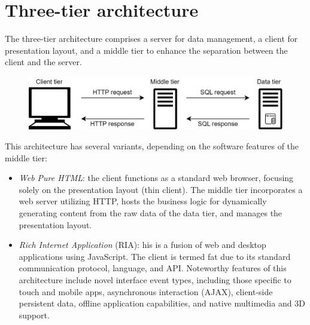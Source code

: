 \section{Three-tier architecture}

The three-tier architecture comprises a server for data management, a client for presentation layout, and a middle tier to enhance the separation between the client and the server.
\begin{figure}[H]
    \centering
    \includegraphics[width=0.5\linewidth]{images/ttph.png}
\end{figure}
This architecture has several variants, depending on the software features of the middle tier:
\begin{itemize}
    \item \textit{Web Pure HTML}: the client functions as a standard web browser, focusing solely on the presentation layout (thin client). 
        The middle tier incorporates a web server utilizing HTTP, hosts the business logic for dynamically generating content from the raw data of the data tier, and manages the presentation layout.
    \item \textit{Rich Internet Application} (RIA): his is a fusion of web and desktop applications using JavaScript.
        The client is termed fat due to its standard communication protocol, language, and API. 
        Noteworthy features of this architecture include novel interface event types, including those specific to touch and mobile apps, asynchronous interaction (AJAX), client-side persistent data, offline application capabilities, and native multimedia and 3D support.
\end{itemize}
